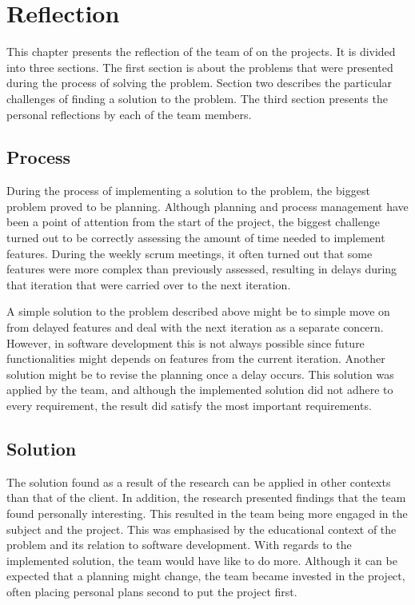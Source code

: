 \chapter{Reflection}
This chapter presents the reflection of the team of on the projects. It is divided into three sections. The first section is about the problems that were presented during the process of solving the problem. Section two describes the particular challenges of finding a solution to the problem. The third section presents the personal reflections by each of the team members.

\section{Process}
During the process of implementing a solution to the problem, the biggest problem proved to be planning. Although planning and process management have been a point of attention from the start of the project, the biggest challenge turned out to be correctly assessing the amount of time needed to implement features. During the weekly scrum meetings, it often turned out that some features were more complex than previously assessed, resulting in delays during that iteration that were carried over to the next iteration.

A simple solution to the problem described above might be to simple move on from delayed features and deal with the next iteration as a separate concern. However, in software development this is not always possible since future functionalities might depends on features from the current iteration. Another solution might be to revise the planning once a delay occurs. This solution was applied by the team, and although the implemented solution did not adhere to every requirement, the result did satisfy the most important requirements.

\section{Solution}
The solution found as a result of the research can be applied in other contexts than that of the client. In addition, the research presented findings that the team found personally interesting. This resulted in the team being more engaged in the subject and the project. This was emphasised by the educational context of the problem and its relation to software development. With regards to the implemented solution, the team would have like to do more. Although it can be expected that a planning might change, the team became invested in the project, often placing personal plans second to put the project first. 

